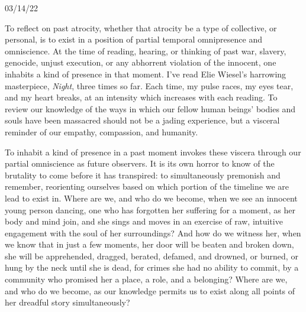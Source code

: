 \documentclass[11pt]{article}
\begin{document}
\vspace*{8\baselineskip}

\begingroup
\begin{center}
\huge 03/14/22
\end{center}
\endgroup

\begingroup
\begin{center}
To reflect on past atrocity, whether that atrocity be a type of collective, or personal, is to exist in a position of partial temporal omnipresence and omniscience. At the time of reading, hearing, or thinking of past war, slavery, genocide, unjust execution, or any abhorrent violation of the innocent, one inhabits a kind of presence in that moment. I've read Elie Wiesel's harrowing masterpiece, \textit{Night}, three times so far. Each time, my pulse races, my eyes tear, and my heart breaks, at an intensity which increases with each reading. To review our knowledge of the ways in which our fellow human beings' bodies and souls have been massacred should not be a jading experience, but a visceral reminder of our empathy, compassion, and humanity. 
\end{center}
\endgroup

\begingroup
\begin{center}
To inhabit a kind of presence in a past moment invokes these viscera through our partial omniscience as future observers. It is its own horror to know of the brutality to come before it has transpired: to simultaneously premonish and remember, reorienting ourselves based on which portion of the timeline we are lead to exist in. Where are we, and who do we become, when we see an innocent young person dancing, one who has forgotten her suffering for a moment, as her body and mind join, and she sings and moves in an exercise of raw, intuitive engagement with the soul of her surroundings? And how do we witness her, when we know that in just a few moments, her door will be beaten and broken down, she will be apprehended, dragged, berated, defamed, and drowned, or burned, or hung by the neck until she is dead, for crimes she had no ability to commit, by a community who promised her a place, a role, and a belonging? Where are we, and who do we become, as our knowledge permits us to exist along all points of her dreadful story simultaneously?
\end{center}
\endgroup
\end{document}
